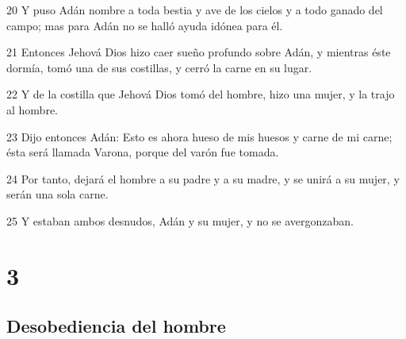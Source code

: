 \par 20 Y puso Adán nombre a toda bestia y ave de los cielos y a todo ganado del campo; mas para Adán no se halló ayuda idónea para él.
\par 21 Entonces Jehová Dios hizo caer sueño profundo sobre Adán, y mientras éste dormía, tomó una de sus costillas, y cerró la carne en su lugar.
\par 22 Y de la costilla que Jehová Dios tomó del hombre, hizo una mujer, y la trajo al hombre.
\par 23 Dijo entonces Adán: Esto es ahora hueso de mis huesos y carne de mi carne; ésta será llamada Varona, porque del varón fue tomada.
\par 24 Por tanto, dejará el hombre a su padre y a su madre, y se unirá a su mujer, y serán una sola carne.
\par 25 Y estaban ambos desnudos, Adán y su mujer, y no se avergonzaban.

\chapter{3}

\section*{Desobediencia del hombre}

